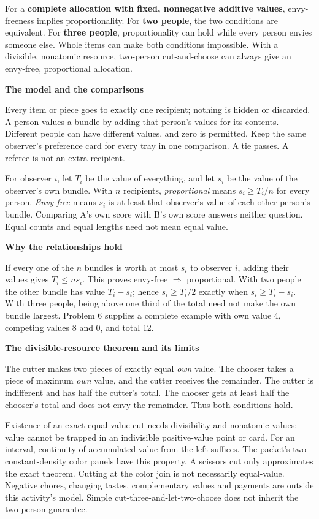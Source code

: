 \documentclass[11pt]{article}
\newcommand{\heading}[1]{\par\vspace{1.5mm}{\large\bfseries #1}\par\vspace{.8mm}}
\newcommand{\subhead}[1]{\par\vspace{1mm}\textbf{#1}\par}
\begin{document}
\heading{Mathematical overview}
For a \textbf{complete allocation with fixed, nonnegative additive values}, envy-freeness implies proportionality. For \textbf{two people}, the two conditions are equivalent. For \textbf{three people}, proportionality can hold while every person envies someone else. Whole items can make both conditions impossible. With a divisible, nonatomic resource, two-person cut-and-choose can always give an envy-free, proportional allocation.

\subhead{The model and the comparisons}
Every item or piece goes to exactly one recipient; nothing is hidden or discarded. A person values a bundle by adding that person's values for its contents. Different people can have different values, and zero is permitted. Keep the same observer's preference card for every tray in one comparison. A tie passes. A referee is not an extra recipient.

For observer $i$, let $T_i$ be the value of everything, and let $s_i$ be the value of the observer's own bundle. With $n$ recipients, \emph{proportional} means $s_i\ge T_i/n$ for every person. \emph{Envy-free} means $s_i$ is at least that observer's value of each other person's bundle. Comparing A's own score with B's own score answers neither question. Equal counts and equal lengths need not mean equal value.

\subhead{Why the relationships hold}
If every one of the $n$ bundles is worth at most $s_i$ to observer $i$, adding their values gives $T_i\le n s_i$. This proves envy-free $\Rightarrow$ proportional. With two people the other bundle has value $T_i-s_i$; hence $s_i\ge T_i/2$ exactly when $s_i\ge T_i-s_i$. With three people, being above one third of the total need not make the own bundle largest. Problem 6 supplies a complete example with own value 4, competing values 8 and 0, and total 12.

\subhead{The divisible-resource theorem and its limits}
The cutter makes two pieces of exactly equal \emph{own} value. The chooser takes a piece of maximum \emph{own} value, and the cutter receives the remainder. The cutter is indifferent and has half the cutter's total. The chooser gets at least half the chooser's total and does not envy the remainder. Thus both conditions hold.

Existence of an exact equal-value cut needs divisibility and nonatomic values: value cannot be trapped in an indivisible positive-value point or card. For an interval, continuity of accumulated value from the left suffices. The packet's two constant-density color panels have this property. A scissors cut only approximates the exact theorem. Cutting at the color join is not necessarily equal-value. Negative chores, changing tastes, complementary values and payments are outside this activity's model. Simple cut-three-and-let-two-choose does not inherit the two-person guarantee.
\end{document}
